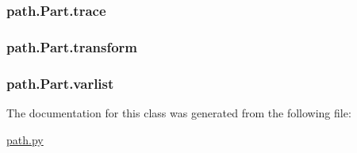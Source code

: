 \subsubsection[{trace}]{\setlength{\rightskip}{0pt plus 5cm}path.\+Part.\+trace}\label{classpath_1_1_part_aa46bbe5ca2996ee60e388415f398b008}
\hypertarget{classpath_1_1_part_a77dd1289501d1f4bce4ff5b4718f7200}{}
\subsubsection[{transform}]{\setlength{\rightskip}{0pt plus 5cm}path.\+Part.\+transform}\label{classpath_1_1_part_a77dd1289501d1f4bce4ff5b4718f7200}
\hypertarget{classpath_1_1_part_a56b959045a54830e9c1f99675b12a075}{}
\subsubsection[{varlist}]{\setlength{\rightskip}{0pt plus 5cm}path.\+Part.\+varlist}\label{classpath_1_1_part_a56b959045a54830e9c1f99675b12a075}


The documentation for this class was generated from the following file\+:\begin{DoxyCompactItemize}
\item 
\hyperlink{path_8py}{path.\+py}\end{DoxyCompactItemize}

